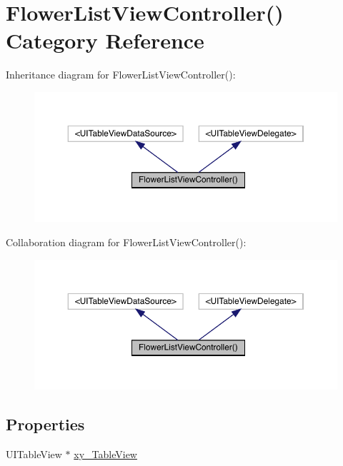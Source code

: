 \hypertarget{category_flower_list_view_controller_07_08}{}\section{Flower\+List\+View\+Controller() Category Reference}
\label{category_flower_list_view_controller_07_08}


Inheritance diagram for Flower\+List\+View\+Controller()\+:\nopagebreak
\begin{figure}[H]
\begin{center}
\leavevmode
\includegraphics[width=350pt]{category_flower_list_view_controller_07_08__inherit__graph}
\end{center}
\end{figure}


Collaboration diagram for Flower\+List\+View\+Controller()\+:\nopagebreak
\begin{figure}[H]
\begin{center}
\leavevmode
\includegraphics[width=350pt]{category_flower_list_view_controller_07_08__coll__graph}
\end{center}
\end{figure}
\subsection*{Properties}
\begin{DoxyCompactItemize}
\item 
U\+I\+Table\+View $\ast$ \mbox{\hyperlink{category_flower_list_view_controller_07_08_a648a1b8763a8c1c684bbaa0a4f658c57}{xy\+\_\+\+Table\+View}}
\end{DoxyCompactItemize}


